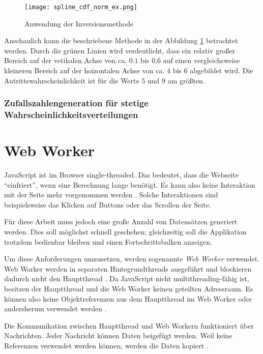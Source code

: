 \begin{figure}[H]
    \centering
    \texttt{[image: spline\_cdf\_norm\_ex.png]}
    \caption{Anwendung der Inversionsmethode}\label{fig:cdfnormex}
\end{figure}

Anschaulich kann die beschriebene Methode in der Abbildung \ref{fig:cdfnormex} betrachtet werden. Durch die grünen Linien wird verdeutlicht, dass ein relativ großer Bereich auf der vetikalen Achse von ca. $0.1$ bis $0.6$ auf einen vergleichsweise kleineren Bereich auf der hoizontalen Achse von ca. $4$ bis $6$ abgebildet wird. Die Autrittswahrscheinlichkeit ist für die Werte $5$ und $9$ am größten.

\subsubsection{Zufallszahlengeneration für stetige Wahrscheinlichkeitsverteilungen}

\section{Web Worker}
JavaScript ist im Browser single-threaded. Das bedeutet, dass die Webseite \enquote{einfriert}, wenn eine Berechnung lange benötigt. Es kann also keine Interaktion mit der Seite mehr vorgenommen werden \cite{googledev:webworkers}. Solche Interaktionen sind beispielsweise das Klicken auf Buttons oder das Scrollen der Seite.

Für diese Arbeit muss jedoch eine große Anzahl von Datensätzen generiert werden. Dies soll möglichst schnell geschehen; gleichzeitig soll die Applikation trotzdem bedienbar bleiben und einen Fortschrittsbalken anzeigen.

Um diese Anforderungen umzusetzen, werden sogenannte \textit{Web Worker} verwendet. Web Worker werden in separaten Hintegrundthreads ausgeführt und blockieren dadurch nicht den Hauptthread \cite{mdn:webworkers}. Da JavaScript nicht multithreading-fähig ist, besitzen der Hauptthread und die Web Worker keinen geteilten Adressraum. Es können also keine Objektreferenzen aus dem Hauptthread im Web Worker oder andersherum verwendet werden \cite{mdn:webworkers}.

Die Kommunikation zwischen Hauptthread und Web Workern funktioniert über Nachrichten. Jeder Nachricht können Daten beigefügt werden. Weil keine Referenzen verwendet werden können, werden die Daten kopiert \cite{mdn:webworkers}.

